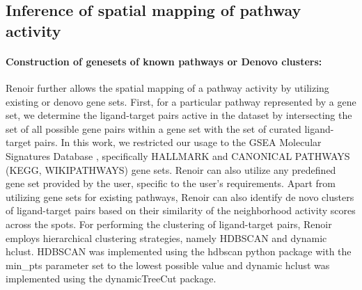 \subsection*{Inference of spatial mapping of pathway activity}

\paragraph{Construction of genesets of known pathways or Denovo clusters:} Renoir further allows the spatial mapping of a pathway activity by utilizing existing or denovo gene sets. First, for a particular pathway represented by a gene set, we determine the ligand-target pairs active in the dataset by intersecting the set of all possible gene pairs within a gene set with the set of curated ligand-target pairs. In this work, we restricted our usage to the GSEA Molecular Signatures Database \citep{doi:10.1073/pnas.0506580102, 10.1093/bioinformatics/btr260}, specifically HALLMARK and CANONICAL PATHWAYS (KEGG, WIKIPATHWAYS) gene sets. Renoir can also utilize any predefined gene set provided by the user, specific to the user's requirements. Apart from utilizing gene sets for existing pathways, Renoir can also identify de novo clusters of ligand-target pairs based on their similarity of the neighborhood activity scores across the spots. For performing the clustering of ligand-target pairs, Renoir employs hierarchical clustering strategies, namely HDBSCAN and dynamic hclust. HDBSCAN was implemented using the hdbscan python package with the min\_pts parameter set to the lowest possible value and dynamic hclust was implemented using the dynamicTreeCut package.


